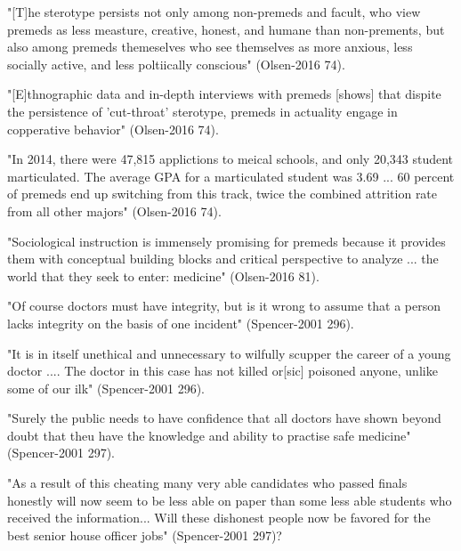 "[T]he sterotype persists not only among non-premeds and facult, who view premeds as less measture, creative, honest, and humane than non-prements, but also among premeds themeselves who see themselves as more anxious, less socially active, and less poltiically conscious" (Olsen-2016 74).

"[E]thnographic data and in-depth interviews with premeds [shows] that dispite the persistence of 'cut-throat' sterotype, premeds in actuality engage in copperative behavior" (Olsen-2016 74).

"In 2014, there were 47,815 applictions to meical schools, and only 20,343 student marticulated. The average GPA for a marticulated student was 3.69 ... 60 percent of premeds end up switching from this track, twice the combined attrition rate from all other majors" (Olsen-2016 74).

"Sociological instruction is immensely promising for premeds because it provides them with conceptual building blocks and critical perspective to analyze ... the world that they seek to enter: medicine" (Olsen-2016 81).


"Of course doctors must have integrity, but is it wrong to assume that a person lacks integrity on the basis of one incident" (Spencer-2001 296).

"It is in itself unethical and unnecessary to wilfully scupper the career of a young doctor .... The doctor in this case has not killed or[sic] poisoned anyone, unlike some of our ilk" (Spencer-2001 296).

"Surely the public needs to have confidence that all doctors have shown beyond doubt that theu have the knowledge and ability to practise safe medicine" (Spencer-2001 297).

"As a result of this cheating many very able candidates who passed finals honestly will now seem to be less able on paper than some less able students who received the information... Will these dishonest people now be favored for the best senior house officer jobs" (Spencer-2001 297)?
